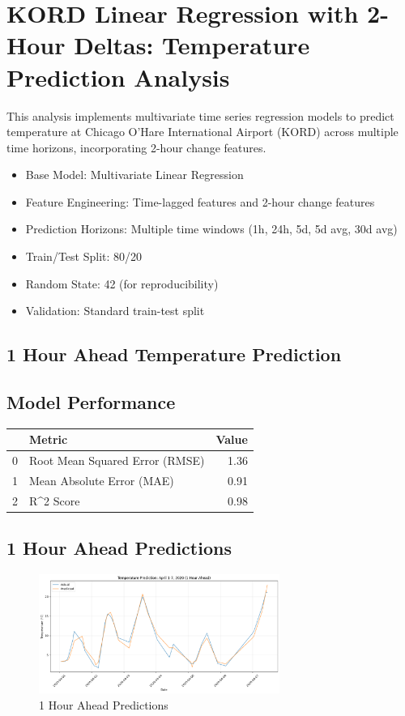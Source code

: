 \section{KORD Linear Regression with 2-Hour Deltas: Temperature Prediction Analysis}
This analysis implements multivariate time series regression models to predict temperature at Chicago O'Hare International Airport (KORD) across multiple time horizons, incorporating 2-hour change features.\
\begin{itemize}
  \item Base Model: Multivariate Linear Regression
  \item Feature Engineering: Time-lagged features and 2-hour change features
  \item Prediction Horizons: Multiple time windows (1h, 24h, 5d, 5d avg, 30d avg)
  \item Train/Test Split: 80/20
  \item Random State: 42 (for reproducibility)
  \item Validation: Standard train-test split
\end{itemize}

\subsection{1 Hour Ahead Temperature Prediction}
\subsection{Model Performance}
\begin{tabular}{llr}
\toprule
 & Metric & Value \\
\midrule
0 & Root Mean Squared Error (RMSE) & 1.36 \\
1 & Mean Absolute Error (MAE) & 0.91 \\
2 & R^2 Score & 0.98 \\
\bottomrule
\end{tabular}

\subsection{1 Hour Ahead Predictions}
\begin{figure}[htbp]
\centering
\includegraphics[width=0.7\textwidth]{1-0-linear_temp_shift_results.png}
\caption{1 Hour Ahead Predictions}
\label{fig:1_hour_ahead_pred}
\end{figure}

